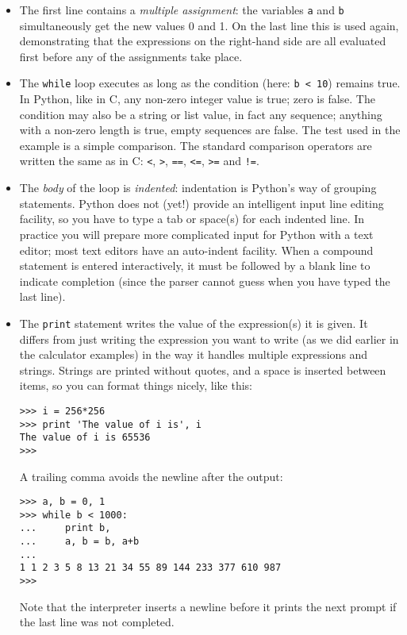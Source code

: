 \begin{itemize}

\item
The first line contains a {\em multiple assignment}: the variables
{\tt a} and {\tt b} simultaneously get the new values 0 and 1.  On the
last line this is used again, demonstrating that the expressions on
the right-hand side are all evaluated first before any of the
assignments take place.

\item
The {\tt while} loop executes as long as the condition (here: {\tt b <
10}) remains true.  In Python, like in C, any non-zero integer value is
true; zero is false.  The condition may also be a string or list value,
in fact any sequence; anything with a non-zero length is true, empty
sequences are false.  The test used in the example is a simple
comparison.  The standard comparison operators are written the same as
in C: {\tt <}, {\tt >}, {\tt ==}, {\tt <=}, {\tt >=} and {\tt !=}.

\item
The {\em body} of the loop is {\em indented}: indentation is Python's
way of grouping statements.  Python does not (yet!) provide an
intelligent input line editing facility, so you have to type a tab or
space(s) for each indented line.  In practice you will prepare more
complicated input for Python with a text editor; most text editors have
an auto-indent facility.  When a compound statement is entered
interactively, it must be followed by a blank line to indicate
completion (since the parser cannot guess when you have typed the last
line).

\item
The {\tt print} statement writes the value of the expression(s) it is
given.  It differs from just writing the expression you want to write
(as we did earlier in the calculator examples) in the way it handles
multiple expressions and strings.  Strings are printed without quotes,
and a space is inserted between items, so you can format things nicely,
like this:

\bcode\begin{verbatim}
>>> i = 256*256
>>> print 'The value of i is', i
The value of i is 65536
>>> 
\end{verbatim}\ecode
%
A trailing comma avoids the newline after the output:

\bcode\begin{verbatim}
>>> a, b = 0, 1
>>> while b < 1000:
...     print b,
...     a, b = b, a+b
... 
1 1 2 3 5 8 13 21 34 55 89 144 233 377 610 987
>>> 
\end{verbatim}\ecode
%
Note that the interpreter inserts a newline before it prints the next
prompt if the last line was not completed.

\end{itemize}


